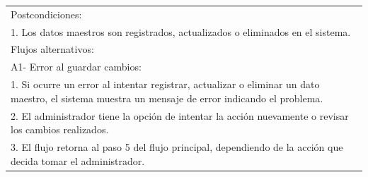 \documentclass[stu, 12pt, letterpaper, donotrepeattitle, floatsintext, natbib]{apa7}
\begin{document}
\begin{longtable}{@{} p{16.5cm} @{}}
    Postcondiciones:                                                                                                                                                                              \\
    1. Los datos maestros son registrados, actualizados o eliminados en el sistema.                                                                                                               \\ \midrule
    Flujos alternativos:                                                                                                                                                                          \\
    A1- Error al guardar cambios:                                                                                                                                                                 \\
    \hspace{1cm}1. Si ocurre un error al intentar registrar, actualizar o eliminar un dato maestro, el sistema muestra un mensaje de error indicando el problema.                                 \\
    \hspace{1cm}2. El administrador tiene la opci\'on de intentar la acci\'on nuevamente o revisar los cambios realizados.                                                                        \\
    \hspace{1cm}3. El flujo retorna al paso 5 del flujo principal, dependiendo de la acci\'on que decida tomar el administrador.                                                                  \\ \bottomrule
\end{longtable}
\newpage
\end{document}
